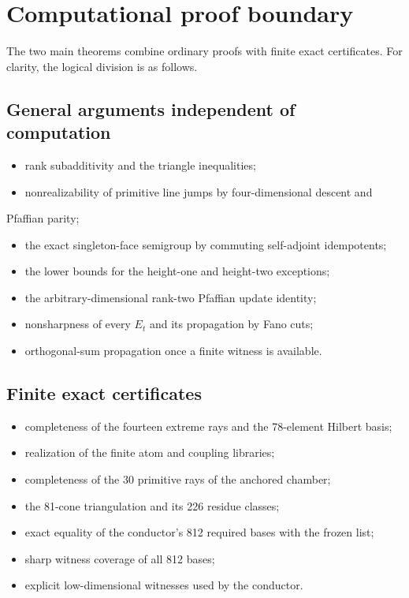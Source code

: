 \documentclass[11pt]{article}
\theoremstyle{remark}
\numberwithin{equation}{section}
\begin{document}
\section{Computational proof boundary}


The two main theorems combine ordinary proofs with finite exact certificates.
For clarity, the logical division is as follows.

\subsection*{General arguments independent of computation}


\begin{itemize}
\item rank subadditivity and the triangle inequalities;
\item nonrealizability of primitive line jumps by four-dimensional descent and
\end{itemize}

  Pfaffian parity;
\begin{itemize}
\item the exact singleton-face semigroup by commuting self-adjoint idempotents;
\item the lower bounds for the height-one and height-two exceptions;
\item the arbitrary-dimensional rank-two Pfaffian update identity;
\item nonsharpness of every $E_t$ and its propagation by Fano cuts;
\item orthogonal-sum propagation once a finite witness is available.

\end{itemize}

\subsection*{Finite exact certificates}


\begin{itemize}
\item completeness of the fourteen extreme rays and the 78-element Hilbert basis;
\item realization of the finite atom and coupling libraries;
\item completeness of the 30 primitive rays of the anchored chamber;
\item the 81-cone triangulation and its 226 residue classes;
\item exact equality of the conductor's 812 required bases with the frozen list;
\item sharp witness coverage of all 812 bases;
\item explicit low-dimensional witnesses used by the conductor.

\end{itemize}
\end{document}
